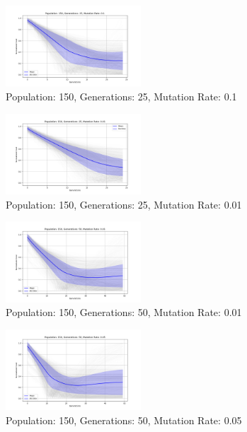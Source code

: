 \documentclass[
]{article}
\begin{document}
    \begin{figure}[H]
        \centering
        \includegraphics[width=0.45\textwidth]{genetic_algorithm/appendix/Population_150_Generations_25_MutationRate_0.1}
        \caption{Population: 150, Generations: 25, Mutation Rate: 0.1}
        \label{fig:app_ga_150_25_1}
    \end{figure}

    \begin{figure}[H]
        \centering
        \includegraphics[width=0.45\textwidth]{genetic_algorithm/appendix/Population_150_Generations_25_MutationRate_0.01}
        \caption{Population: 150, Generations: 25, Mutation Rate: 0.01}
        \label{fig:app_ga_150_25_01}
    \end{figure}

    \begin{figure}[H]
        \centering
        \includegraphics[width=0.45\textwidth]{genetic_algorithm/appendix/Population_150_Generations_50_MutationRate_0.01}
        \caption{Population: 150, Generations: 50, Mutation Rate: 0.01}
        \label{fig:app_ga_150_50_01}
    \end{figure}

    \begin{figure}[H]
        \centering
        \includegraphics[width=0.45\textwidth]{genetic_algorithm/appendix/Population_150_Generations_50_MutationRate_0.05}
        \caption{Population: 150, Generations: 50, Mutation Rate: 0.05}
        \label{fig:app_ga_150_50_05}
    \end{figure}
\end{document}
